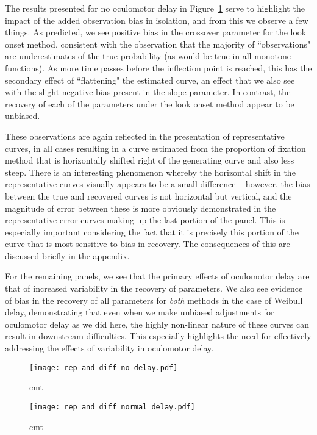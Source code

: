 The results presented for no oculomotor delay in Figure~\ref{fig:panel_no_delay} serve to highlight the impact of the added observation bias in isolation, and from this we observe a few things. As predicted, we see positive bias in the crossover parameter for the look onset method, consistent with the observation that the majority of ``observations" are underestimates of the true probability (as would be true in all monotone functions). As more time passes before the inflection point is reached, this has the secondary effect of ``flattening" the estimated curve, an effect that we also see with the slight negative bias present in the slope parameter. In contrast, the recovery of each of the parameters under the look onset method appear to be unbiased.

These observations are again reflected in the presentation of representative curves, in all cases resulting in a curve estimated from the proportion of fixation method that is horizontally shifted right of the generating curve and also less steep. There is an interesting phenomenon whereby the horizontal shift in the representative curves visually appears to be a small difference -- however, the bias between the true and recovered curves is not horizontal but vertical, and the magnitude of error between these is more obviously demonstrated in the representative error curves making up the last portion of the panel. This is especially important considering the fact that it is precisely this portion of the curve that is most sensitive to bias in recovery. The consequences of this are discussed briefly in the appendix. 

For the remaining panels, we see that the primary effects of oculomotor delay are that of increased variability in the recovery of parameters. We also see evidence of bias in the recovery of all parameters for \textit{both} methods in the case of Weibull delay, demonstrating that even when we make unbiased adjustments for oculomotor delay as we did here, the highly non-linear nature of these curves can result in downstream difficulties. This especially highlights the need for effectively addressing the effects of variability in oculomotor delay.

\begin{figure}[H]
\centering
\texttt{[image: rep\_and\_diff\_no\_delay.pdf]}
\caption{cmt}
\label{fig:panel_no_delay}
\end{figure}


\begin{figure}[H]
\centering
\texttt{[image: rep\_and\_diff\_normal\_delay.pdf]}
\caption{cmt}
\label{fig:panel_normal_delay}
\end{figure}



